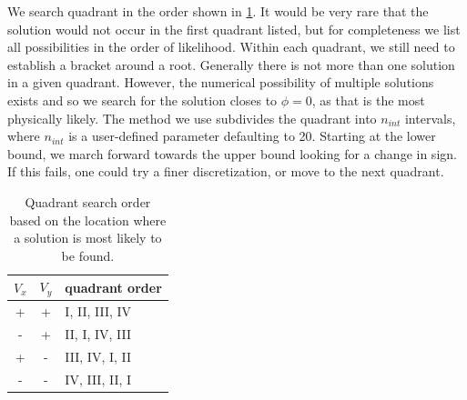 \documentclass{article}
\begin{document}
We search quadrant in the order shown in \cref{tab:brackets}.  It would be very rare that the solution would not occur in the first quadrant listed, but for completeness we list all possibilities in the order of likelihood.  Within each quadrant, we still need to establish a bracket around a root.  Generally there is not more than one solution in a given quadrant.  However, the numerical possibility of multiple solutions exists and so we search for the solution closes to $\phi = 0$, as that is the most physically likely.  The method we use subdivides the quadrant into $n_{int}$ intervals, where $n_{int}$ is a user-defined parameter defaulting to 20.  Starting at the lower bound, we march forward towards the upper bound looking for a change in sign.  If this fails, one could try a finer discretization, or move to the next quadrant.

\begin{table}[htb]
\centering
\caption{Quadrant search order based on the location where a solution is most likely to be found.}
\label{tab:brackets}
\begin{tabular}{@{}ccl@{}}
\toprule
$V_x$ & $V_y$ & quadrant order \\
\midrule
+ & + & I, II, III, IV \\
- & + & II, I, IV, III \\
+ & - & III, IV, I, II \\
- & - & IV, III, II, I \\
\bottomrule
\end{tabular}
\end{table}




\end{document}
